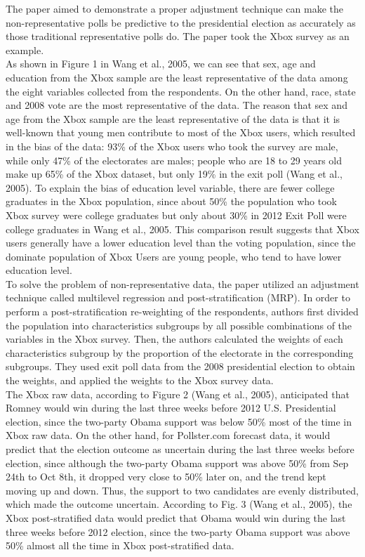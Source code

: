 \documentclass[12pt]{article}
\newcommand\tab[1][1cm]{\hspace*{#1}}
\begin{document}
\tab The paper aimed to demonstrate a proper adjustment technique can make the non-representative polls be predictive to the presidential election as accurately as those traditional representative polls do. The paper took the Xbox survey as an example.\\
\tab As shown in Figure 1 in Wang et al., 2005, we can see that sex, age and education from the Xbox sample are the least representative of the data among the eight variables collected from the respondents. On the other hand, race, state and 2008 vote are the most representative of the data. The reason that sex and age from the Xbox sample are the least representative of the data is that it is well-known that young men contribute to most of the Xbox users, which resulted in the bias of the data: 93\% of the Xbox users who took the survey are male, while only 47\% of the electorates are males; people who are 18 to 29 years old make up 65\% of the Xbox dataset, but only 19\% in the exit poll (Wang et al., 2005). To explain the bias of education level variable, there are fewer college graduates in the Xbox population, since about 50\% the population who took Xbox survey were college graduates but only about 30\% in 2012 Exit Poll were college graduates in Wang et al., 2005. This comparison result suggests that Xbox users generally have a lower education level than the voting population, since the dominate population of Xbox Users are young people, who tend to have lower education level.\\
\tab To solve the problem of non-representative data, the paper utilized an adjustment technique called multilevel regression and post-stratification (MRP). In order to perform a post-stratification re-weighting of the respondents, authors first divided the population into characteristics subgroups by all possible combinations of the variables in the Xbox survey. Then, the authors calculated the weights of each characteristics subgroup by the proportion of the electorate in the corresponding subgroups. They used exit poll data from the 2008 presidential election to obtain the weights, and applied the weights to the Xbox survey data.\\
\tab The Xbox raw data, according to Figure 2 (Wang et al., 2005), anticipated that Romney would win during the last three weeks before 2012 U.S. Presidential election, since the two-party Obama support was below 50\% most of the time in Xbox raw data. On the other hand, for Pollster.com forecast data, it would predict that the election outcome as uncertain during the last three weeks before election, since although the two-party Obama support was above 50\% from Sep 24th to Oct 8th, it dropped very close to 50\% later on, and the trend kept moving up and down. Thus, the support to two candidates are evenly distributed, which made the outcome uncertain. According to Fig. 3 (Wang et al., 2005), the Xbox post-stratified data would predict that Obama would win during the last three weeks before 2012 election, since the two-party Obama support was above 50\% almost all the time in Xbox post-stratified data.
\end{document}
